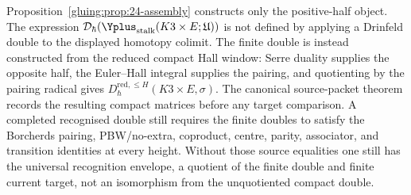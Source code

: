 \begin{remark}
\label{gluing:rem:no-double-through-hocolim}
Proposition~\ref{gluing:prop:24-assembly} constructs only the
positive-half object. The expression
\(\mathcal{D}_{\hbar}(\Yplus_{\mathrm{stalk}}(K3\times E;\mathfrak U))\)
is not defined by applying a Drinfeld double to the displayed homotopy
colimit. The finite double is instead constructed from the reduced
compact Hall window: Serre duality supplies the opposite half, the
Euler--Hall integral supplies the pairing, and quotienting by the
pairing radical gives
\(D^{\mathrm{red},\leq H}_{\hbar}(K3\times E,\sigma)\). The canonical
source-packet theorem records the resulting compact matrices before
any target comparison. A completed
recognised double still requires the finite doubles to satisfy the
Borcherds pairing, PBW/no-extra, coproduct, centre, parity,
associator, and transition identities at every height. Without those source
equalities one still has the universal recognition envelope, a quotient
of the finite double and finite current target, not an isomorphism from
the unquotiented compact double.
\end{remark}

